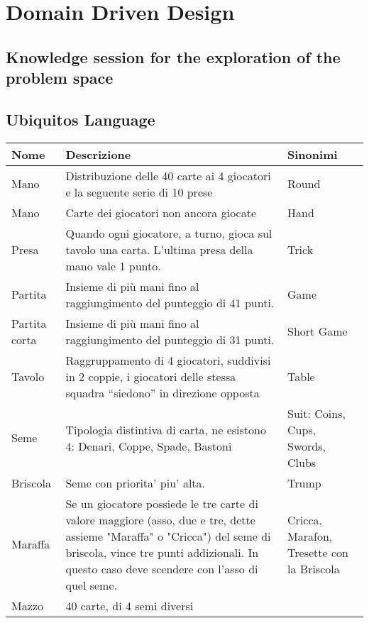 \chapter{Domain Driven Design}
\label{ch:ddd} %

\section{Knowledge session for the exploration of the problem space}
\section{Ubiquitos Language}
\begin{table}[!ht]
    \centering
    \begin{tabular}{|l|l|l|}
    \hline
        Nome & Descrizione & Sinonimi \\ \hline
        Mano & Distribuzione delle 40 carte ai 4 giocatori e la seguente serie di 10 prese & Round \\ \hline
        Mano & Carte dei giocatori non ancora giocate & Hand \\ \hline
        Presa & Quando ogni giocatore, a turno, gioca sul tavolo una carta. L’ultima presa della mano vale 1 punto. & Trick \\ \hline
        Partita & Insieme di più mani fino al raggiungimento del punteggio di 41 punti. & Game \\ \hline
        Partita corta & Insieme di più mani fino al raggiungimento del punteggio di 31 punti. & Short Game \\ \hline
        Tavolo & Raggruppamento di 4 giocatori, suddivisi in 2 coppie, i giocatori delle stessa squadra “siedono” in direzione opposta & Table \\ \hline
        Seme & Tipologia distintiva di carta, ne esistono 4: Denari, Coppe, Spade, Bastoni & Suit: Coins, Cups, Swords, Clubs~ \\ \hline
        Briscola & Seme con priorita’ piu’ alta. & Trump \\ \hline
        Maraffa & Se un giocatore possiede le tre carte di valore maggiore (asso, due e tre, dette assieme "Maraffa" o "Cricca") del seme di briscola, vince tre punti addizionali. In questo caso deve scendere con l'asso di quel seme. & Cricca, Marafon, Tresette con la Briscola \\ \hline
        Mazzo & 40 carte, di 4 semi diversi & ~ \\ \hline

\end{tabular}
\end{table}
